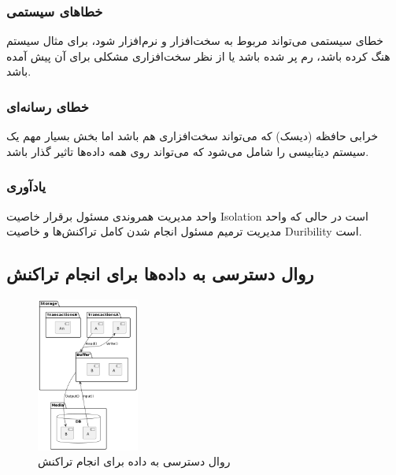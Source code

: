 \subsubsection{خطا‌های سیستمی}

خطای سیستمی می‌تواند مربوط به سخت‌افزار و نرم‌افزار شود، برای مثال سیستم هنگ
کرده باشد، رم پر شده باشد یا از نظر سخت‌افزاری مشکلی برای آن پیش آمده باشد.

\subsubsection{خطای رسانه‌ای}

خرابی حافظه (دیسک) که می‌تواند سخت‌افزاری هم باشد اما بخش بسیار مهم یک سیستم
دیتابیسی را شامل می‌شود که می‌تواند روی همه داده‌ها تاثیر گذار باشد.

\subsubsection*{یادآوری}

واحد مدیریت همروندی مسئول برقرار خاصیت Isolation است در حالی که واحد مدیریت
ترمیم مسئول انجام شدن کامل تراکنش‌ها و خاصیت Duribility است.

\subsection{روال دسترسی به داده‌ها برای انجام تراکنش}





\begin{figure}
    \centering
    \includegraphics[width=0.3\textwidth]{umls/media.png}
    \caption{روال دسترسی به داده برای انجام تراکنش}
    \label{fig:media}
\end{figure}

